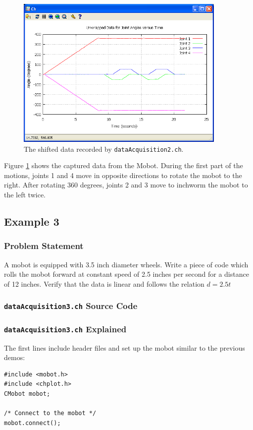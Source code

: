 \documentclass{article}
\begin{document}
\begin{figure}[H]
\centering
\includegraphics[width=4in]{images/dataacq2_plot1.png}
\caption{\label{fig:dataacq2_fig1} The shifted data recorded by \texttt{dataAcquisition2.ch}.}
\end{figure}

Figure \ref{fig:dataacq2_fig1} shows the captured data from the Mobot. During the first
part of the motions, joints 1 and 4 move in opposite directions to rotate the mobot to
the right. After rotating 360 degrees, joints 2 and 3 move to inchworm the mobot to the
left twice.

\subsection{Example 3}
\subsubsection{Problem Statement}
A mobot is equipped with 3.5 inch diameter wheels. Write a piece of code which rolls the
mobot forward at constant speed of 2.5 inches per second for a distance of 12 inches. 
Verify that the data is linear and follows the relation $d = 2.5t$

\subsubsection{\texttt{dataAcquisition3.ch} Source Code}


\subsubsection{\texttt{dataAcquisition3.ch} Explained}
The first lines include header files and set up the mobot similar to the previous
demos:
\begin{verbatim}
#include <mobot.h>
#include <chplot.h>
CMobot mobot;

/* Connect to the mobot */
mobot.connect();
\end{verbatim}
\end{document}
